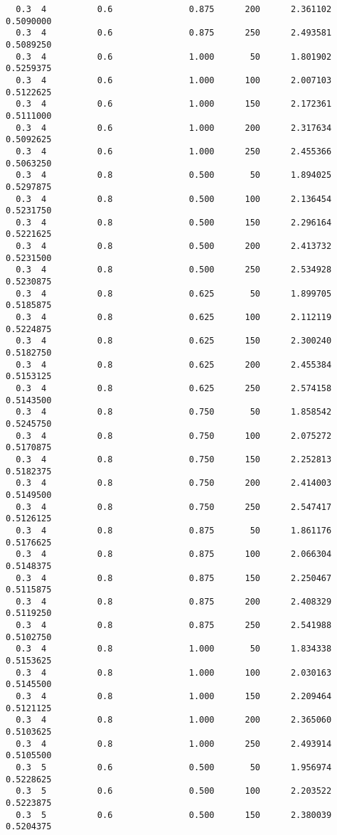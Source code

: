 \documentclass[
  letterpaper,
  DIV=11,
  numbers=noendperiod]{scrartcl}
\begin{document}
\begin{verbatim}
  0.3  4          0.6               0.875      200      2.361102  0.5090000
  0.3  4          0.6               0.875      250      2.493581  0.5089250
  0.3  4          0.6               1.000       50      1.801902  0.5259375
  0.3  4          0.6               1.000      100      2.007103  0.5122625
  0.3  4          0.6               1.000      150      2.172361  0.5111000
  0.3  4          0.6               1.000      200      2.317634  0.5092625
  0.3  4          0.6               1.000      250      2.455366  0.5063250
  0.3  4          0.8               0.500       50      1.894025  0.5297875
  0.3  4          0.8               0.500      100      2.136454  0.5231750
  0.3  4          0.8               0.500      150      2.296164  0.5221625
  0.3  4          0.8               0.500      200      2.413732  0.5231500
  0.3  4          0.8               0.500      250      2.534928  0.5230875
  0.3  4          0.8               0.625       50      1.899705  0.5185875
  0.3  4          0.8               0.625      100      2.112119  0.5224875
  0.3  4          0.8               0.625      150      2.300240  0.5182750
  0.3  4          0.8               0.625      200      2.455384  0.5153125
  0.3  4          0.8               0.625      250      2.574158  0.5143500
  0.3  4          0.8               0.750       50      1.858542  0.5245750
  0.3  4          0.8               0.750      100      2.075272  0.5170875
  0.3  4          0.8               0.750      150      2.252813  0.5182375
  0.3  4          0.8               0.750      200      2.414003  0.5149500
  0.3  4          0.8               0.750      250      2.547417  0.5126125
  0.3  4          0.8               0.875       50      1.861176  0.5176625
  0.3  4          0.8               0.875      100      2.066304  0.5148375
  0.3  4          0.8               0.875      150      2.250467  0.5115875
  0.3  4          0.8               0.875      200      2.408329  0.5119250
  0.3  4          0.8               0.875      250      2.541988  0.5102750
  0.3  4          0.8               1.000       50      1.834338  0.5153625
  0.3  4          0.8               1.000      100      2.030163  0.5145500
  0.3  4          0.8               1.000      150      2.209464  0.5121125
  0.3  4          0.8               1.000      200      2.365060  0.5103625
  0.3  4          0.8               1.000      250      2.493914  0.5105500
  0.3  5          0.6               0.500       50      1.956974  0.5228625
  0.3  5          0.6               0.500      100      2.203522  0.5223875
  0.3  5          0.6               0.500      150      2.380039  0.5204375

\end{verbatim}
\end{document}
